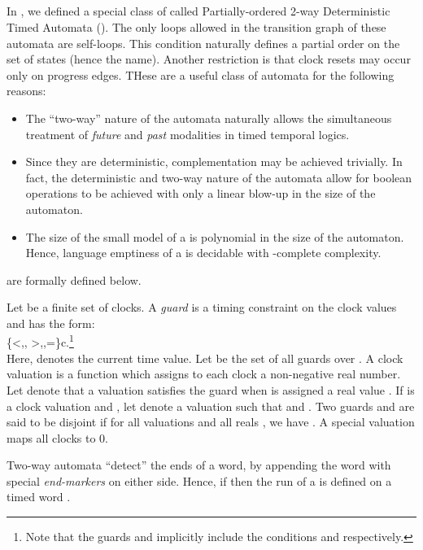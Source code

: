 \documentclass{llncs}
\newcommand{\potdta}{\mbox{}}
\newcommand{\twodta}{\mbox{}}
\newcommand{\np}{\mbox{}}
\newcommand{\tab}{\hspace*{1cm}}
\begin{document}
\subsection{\potdta}
In \cite{PS10}, we defined a special class of \twodta\/ called Partially-ordered 2-way Deterministic Timed Automata (\potdta). The only loops allowed in the transition graph of these automata are self-loops. This condition naturally defines a partial order on the set of states (hence the name). Another restriction is that clock resets may occur only on progress edges. THese are a useful class of automata for the following reasons: 
\begin{itemize}
\item The ``two-way'' nature of the automata naturally allows the simultaneous treatment of \textit{future} and \textit{past} modalities in timed temporal logics.
\item Since they are deterministic, complementation may be achieved trivially. In fact, the deterministic and two-way nature of the automata allow for boolean operations to be achieved with only a linear blow-up in the size of the automaton.
\item The size of the small model of a \potdta\/ is polynomial in the size of the automaton. Hence, language emptiness of a \potdta\/ is decidable with \np-complete complexity.
\end{itemize} 

\potdta\/ are formally defined below.

Let  be a finite set of clocks. A \emph{guard}  is a timing constraint on the clock values and has the form:\\
\tab  \approx\in \{<,\leq, >,\geq,=\}c\in{}.\footnote{Note that the guards  and  implicitly include the conditions  and  respectively.}\\

Here,  denotes the current time value. Let  be the set of all guards over . A clock valuation is a function which assigns to each clock a non-negative real number. Let  denote that a valuation  satisfies the guard  when  is assigned a real value . If  is a clock valuation  and , let  denote a valuation such that  and . Two guards  and  are said to be disjoint if for all valuations  and all reals , 
we have . A special valuation  maps all clocks to 0.

Two-way automata ``detect'' the ends of a word, by appending the word with special \emph{end-markers} on either side. Hence, if  then the run of a \potdta\/ is defined on a timed word .
\end{document}
